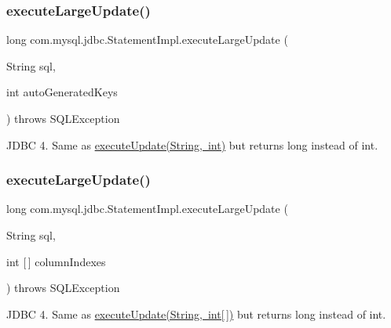 \subsubsection{\texorpdfstring{execute\+Large\+Update()}{executeLargeUpdate()}\hspace{0.1cm}{\footnotesize\ttfamily [2/4]}}
{\footnotesize\ttfamily long com.\+mysql.\+jdbc.\+Statement\+Impl.\+execute\+Large\+Update (\begin{DoxyParamCaption}\item[{String}]{sql,  }\item[{int}]{auto\+Generated\+Keys }\end{DoxyParamCaption}) throws S\+Q\+L\+Exception}

J\+D\+BC 4. Same as \mbox{\hyperlink{classcom_1_1mysql_1_1jdbc_1_1_statement_impl_ab13499dab119bd6814990fb5c64b3463}{execute\+Update(\+String, int)}} but returns long instead of int. \mbox{\label{classcom_1_1mysql_1_1jdbc_1_1_statement_impl_afc5fbce4be94a79867778d9f1c0e20bb}} 
\subsubsection{\texorpdfstring{execute\+Large\+Update()}{executeLargeUpdate()}\hspace{0.1cm}{\footnotesize\ttfamily [3/4]}}
{\footnotesize\ttfamily long com.\+mysql.\+jdbc.\+Statement\+Impl.\+execute\+Large\+Update (\begin{DoxyParamCaption}\item[{String}]{sql,  }\item[{int \mbox{[}$\,$\mbox{]}}]{column\+Indexes }\end{DoxyParamCaption}) throws S\+Q\+L\+Exception}

J\+D\+BC 4. Same as \mbox{\hyperlink{}{execute\+Update(\+String, int\mbox{[}$\,$\mbox{]})}} but returns long instead of int. \mbox{\label{classcom_1_1mysql_1_1jdbc_1_1_statement_impl_ac15cba5e08e73a6022b347ed5427dd68}} 
